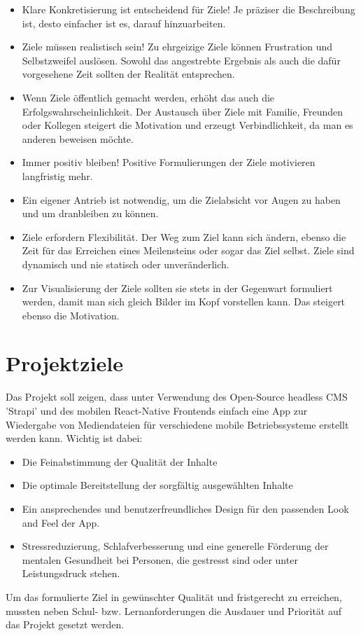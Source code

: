 \begin{itemize}
    \item Klare Konkretisierung ist entscheidend für Ziele! Je präziser die Beschreibung ist, desto einfacher
          ist es, darauf hinzuarbeiten.
    \item Ziele müssen realistisch sein! Zu ehrgeizige Ziele können Frustration und Selbstzweifel
          auslösen. Sowohl das angestrebte Ergebnis als auch die dafür vorgesehene Zeit sollten der Realität
          entsprechen.
    \item Wenn Ziele öffentlich gemacht werden, erhöht das auch die Erfolgswahrscheinlichkeit. Der Austausch
          über Ziele mit Familie, Freunden oder Kollegen steigert die Motivation und erzeugt Verbindlichkeit, da
          man es anderen beweisen möchte.
    \item Immer positiv bleiben! Positive Formulierungen der Ziele motivieren langfristig mehr.
    \item Ein eigener Antrieb ist notwendig, um die Zielabsicht vor Augen zu haben und um dranbleiben zu
          können.
    \item Ziele erfordern Flexibilität. Der Weg zum Ziel kann sich ändern, ebenso die Zeit für das Erreichen
          eines Meilensteins oder sogar das Ziel selbst. Ziele sind dynamisch und nie statisch oder unveränderlich.
    \item Zur Visualisierung der Ziele sollten sie stets in der Gegenwart formuliert werden, damit man sich
          gleich Bilder im Kopf vorstellen kann. Das steigert ebenso die Motivation.
\end{itemize}

\section{Projektziele}
Das Projekt soll zeigen, dass unter Verwendung des Open-Source headless CMS 'Strapi' und des mobilen
React-Native Frontends einfach eine App zur Wiedergabe von Mediendateien für verschiedene mobile Betriebssysteme
erstellt werden kann. Wichtig ist dabei: 

\begin{itemize}
    \item Die Feinabstimmung der Qualität der Inhalte
    \item Die optimale Bereitstellung der sorgfältig ausgewählten Inhalte
    \item Ein ansprechendes und benutzerfreundliches Design für den passenden Look and Feel der App.
    \item Stressreduzierung, Schlafverbesserung und eine generelle Förderung der mentalen Gesundheit bei
          Personen, die gestresst sind oder unter Leistungsdruck stehen.
\end{itemize}

Um das formulierte Ziel in gewünschter Qualität und fristgerecht zu erreichen, mussten
neben Schul- bzw. Lernanforderungen die Ausdauer und Priorität auf das Projekt
gesetzt werden.

